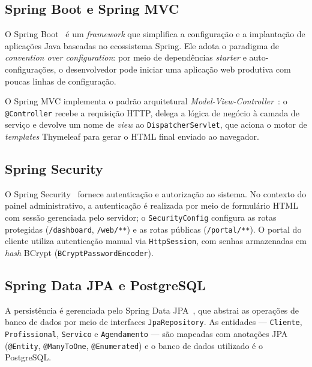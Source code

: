
\subsection{Spring Boot e Spring MVC}

O Spring Boot~\cite{springboot} é um \textit{framework} que simplifica a
configuração e a implantação de aplicações Java baseadas no ecossistema
Spring.  Ele adota o paradigma de \textit{convention over configuration}:
por meio de dependências \textit{starter} e auto-configurações, o
desenvolvedor pode iniciar uma aplicação web produtiva com poucas linhas de
configuração.

O Spring MVC implementa o padrão arquitetural
\textit{Model-View-Controller}~\cite{gamma1994}: o \texttt{@Controller}
recebe a requisição HTTP, delega a lógica de negócio à camada de serviço e
devolve um nome de \textit{view} ao \texttt{DispatcherServlet}, que aciona
o motor de \textit{templates} Thymeleaf para gerar o HTML final enviado ao
navegador.

\subsection{Spring Security}

O Spring Security~\cite{springsecurity} fornece autenticação e autorização ao
sistema.  No contexto do painel administrativo, a autenticação é realizada
por meio de formulário HTML com sessão gerenciada pelo servidor; o
\texttt{SecurityConfig} configura as rotas protegidas (\texttt{/dashboard},
\texttt{/web/**}) e as rotas públicas (\texttt{/portal/**}).  O portal do
cliente utiliza autenticação manual via \texttt{HttpSession}, com senhas
armazenadas em \textit{hash} BCrypt (\texttt{BCryptPasswordEncoder}).

\subsection{Spring Data JPA e PostgreSQL}

A persistência é gerenciada pelo Spring Data JPA~\cite{springdatajpa},
que abstrai as operações de banco de dados por meio de interfaces
\texttt{JpaRepository}.  As entidades — \texttt{Cliente},
\texttt{Profissional}, \texttt{Servico} e \texttt{Agendamento} — são
mapeadas com anotações JPA (\texttt{@Entity}, \texttt{@ManyToOne},
\texttt{@Enumerated}) e o banco de dados utilizado é o PostgreSQL.


